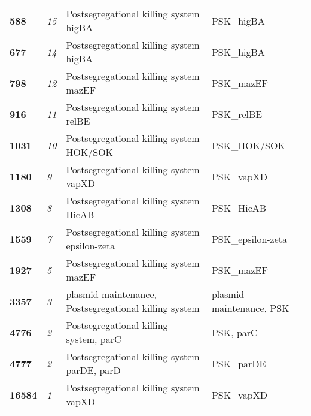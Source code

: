 \begin{longtable}{ >{\bfseries\small}p{}| >{\itshape\small}p{} >{\small}p{} | >{\small}p{}}
588 & 15 & Postsegregational killing system higBA & PSK\_higBA\\
677 & 14 & Postsegregational killing system higBA & PSK\_higBA\\
798 & 12 & Postsegregational killing system mazEF & PSK\_mazEF\\
916 & 11 & Postsegregational killing system relBE & PSK\_relBE\\
1031 & 10 & Postsegregational killing system HOK/SOK & PSK\_HOK/SOK\\
1180 & 9 & Postsegregational killing system vapXD & PSK\_vapXD\\
1308 & 8 & Postsegregational killing system HicAB & PSK\_HicAB\\
1559 & 7 & Postsegregational killing system epsilon-zeta & PSK\_epsilon-zeta\\
1927 & 5 & Postsegregational killing system mazEF & PSK\_mazEF\\
3357 & 3 & plasmid maintenance, Postsegregational killing system & plasmid maintenance, PSK\\
4776 & 2 & Postsegregational killing system, parC & PSK, parC\\
4777 & 2 & Postsegregational killing system parDE, parD & PSK\_parDE\\
16584 & 1 & Postsegregational killing system vapXD & PSK\_vapXD\\
\end{longtable}